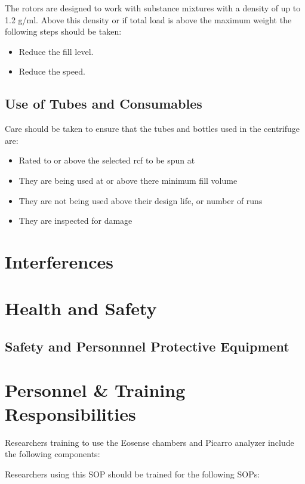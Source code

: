 \documentclass[12pt]{../SOP3_beta}
\begin{document}
\NP The rotors are designed to work with substance mixtures with a density of up to 1.2 g/ml. Above this density or if total load is above the maximum weight the following steps should be taken:

\begin{itemize}
  \item Reduce the fill level.
  \item Reduce the speed. 
\end{itemize}

\subsection*{Use of Tubes and Consumables}

\NP Care should be taken to ensure that the tubes and bottles used in the centrifuge are: 

\begin{itemize}
  \item Rated to or above the selected rcf to be spun at
  \item They are being used at or above there minimum fill volume
  \item They are not being used above their design life, or number of runs
  \item They are inspected for damage 
\end{itemize}

\section{Interferences}

\section{Health and Safety}

\subsection{Safety and Personnnel Protective Equipment}


\section{Personnel \& Training Responsibilities}

Researchers training to use the Eosense chambers and Picarro analyzer include the following components: 



Researchers using this SOP should be trained for the following SOPs:
\end{document}
